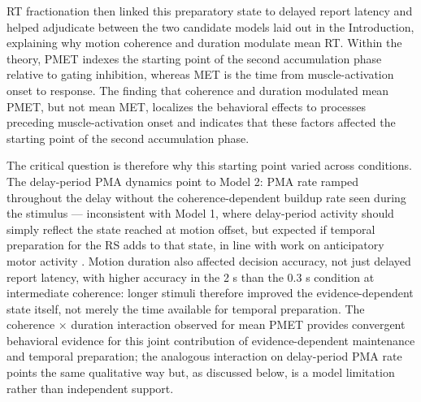 RT fractionation then linked this preparatory state to delayed report latency and helped adjudicate between the two candidate models laid out in the Introduction, explaining why motion coherence and duration modulate mean RT. Within the theory, PMET indexes the starting point of the second accumulation phase relative to gating inhibition, whereas MET is the time from muscle-activation onset to response. The finding that coherence and duration modulated mean PMET, but not mean MET, localizes the behavioral effects to processes preceding muscle-activation onset and indicates that these factors affected the starting point of the second accumulation phase.

The critical question is therefore why this starting point varied across conditions. The delay-period PMA dynamics point to Model 2: PMA rate ramped throughout the delay without the coherence-dependent buildup rate seen during the stimulus --- inconsistent with Model 1, where delay-period activity should simply reflect the state reached at motion offset, but expected if temporal preparation for the RS adds to that state, in line with work on anticipatory motor activity \parencites{burleExcitatoryInhibitoryMotor2010}{heidemanTemporalAlignmentAnticipatory2018}{ramayyaHumanResponseTimes2025}. Motion duration also affected decision accuracy, not just delayed report latency, with higher accuracy in the 2 s than the 0.3 s condition at intermediate coherence: longer stimuli therefore improved the evidence-dependent state itself, not merely the time available for temporal preparation. The coherence $\times$ duration interaction observed for mean PMET provides convergent behavioral evidence for this joint contribution of evidence-dependent maintenance and temporal preparation; the analogous interaction on delay-period PMA rate points the same qualitative way but, as discussed below, is a model limitation rather than independent support.

    

